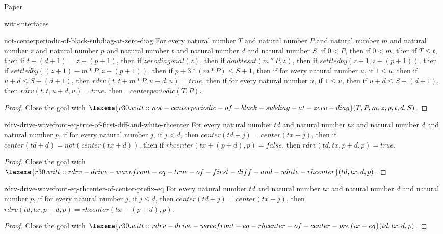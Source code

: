 \begin{lexlean}{Paper}
\begin{section}{witt-interfaces}
  \begin{theorem}{not-centerperiodic-of-black-subdiag-at-zero-diag}
  For every natural number \(T\) and natural number \(P\) and natural number \(m\) and natural number \(z\) and natural number \(p\) and natural number \(t\) and natural number \(d\) and natural number \(S\), if \(0 < P\), then if \(0 < m\), then if \(T ≤ t\), then if \(t + (d + 1) = z + (p + 1)\), then if \(zerodiagonal(z)\), then if \(doublesat(m * P, z)\), then if \(settledby(z + 1, z + (p + 1))\), then if \(settledby((z + 1) - m * P, z + (p + 1))\), then if \(p + 3 * (m * P) ≤ S + 1\), then if for every natural number \(u\), if \(1 ≤ u\), then if \(u + d ≤ S + (d + 1)\), then \(rdrv(t, t + m * P, u + d, u) = true\), then if for every natural number \(u\), if \(1 ≤ u\), then if \(u + d ≤ S + (d + 1)\), then \(rdrv(t, t, u + d, u) = true\), then \(¬ centerperiodic(T, P)\).
  \begin{proof}
  Close the goal with \(\lexeme{r30.witt::not-centerperiodic-of-black-subdiag-at-zero-diag}(T, P, m, z, p, t, d, S)\).
  \end{proof}
  \end{theorem}

  \begin{theorem}{rdrv-drive-wavefront-eq-true-of-first-diff-and-white-rhcenter}
  For every natural number \(td\) and natural number \(tx\) and natural number \(d\) and natural number \(p\), if for every natural number \(j\), if \(j < d\), then \(center(td + j) = center(tx + j)\), then if \(center(td + d) = not(center(tx + d))\), then if \(rhcenter(tx + (p + d), p) = false\), then \(rdrv(td, tx, p + d, p) = true\).
  \begin{proof}
  Close the goal with \(\lexeme{r30.witt::rdrv-drive-wavefront-eq-true-of-first-diff-and-white-rhcenter}(td, tx, d, p)\).
  \end{proof}
  \end{theorem}

  \begin{theorem}{rdrv-drive-wavefront-eq-rhcenter-of-center-prefix-eq}
  For every natural number \(td\) and natural number \(tx\) and natural number \(d\) and natural number \(p\), if for every natural number \(j\), if \(j ≤ d\), then \(center(td + j) = center(tx + j)\), then \(rdrv(td, tx, p + d, p) = rhcenter(tx + (p + d), p)\).
  \begin{proof}
  Close the goal with \(\lexeme{r30.witt::rdrv-drive-wavefront-eq-rhcenter-of-center-prefix-eq}(td, tx, d, p)\).
  \end{proof}
  \end{theorem}


\end{section}
\end{lexlean}

